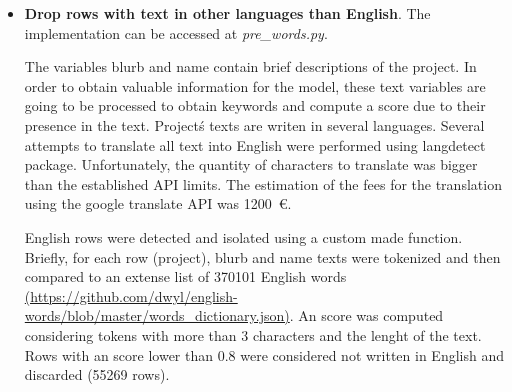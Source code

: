 \documentclass{article}
\begin{document}
{\begin{itemize}
\begin{itemize}
	The number of columns was reduced to 304.
	
        \item Country pruning.
        The implementation can be accessed at \emph{pre\_country\_pruning.py}.  
	
	Projects in the dataset come from 198 countries. In order to reduce the number of variables, I performed count plots and percentages of successful projects by country. Only countries with more than 55\% of successful projects and more than 50 projects were kept (United Kingdom, Hong Kong, Japan, Singapore, China, Poland, Israel, Taiwan, Czech Republic, Greece, Indonesia, Argentina, Kenya, Iceland, Ghana, Portugal, Slovenia, Finland).
	
	The number of columns was reduced to 125.
	
	\item  Currency pruning.
	The implementation can be accessed at \emph{pre\_currency\_pruning.py }.
	
	Currency encodes 14 different levels. Count plots and percentages of succesfull projects were computed for tha variable 'currency\_orig'. Currencies with more than 55\% of successful projects were retained (GBP, HKD, SGD, JPY) and compared to the retained countries. All currency levels were dropped because the selected currencies correspond to countries that were already selected and the information was redundant.
	
	The number of columns was reduced to 112.
        
    \end{itemize}
    \item \textbf{Drop rows with text in other languages than English}.
    The implementation can be accessed at \emph{pre\_words.py}.
    
    The variables blurb and name contain brief descriptions of the project. In order to obtain valuable information for the model, these text variables are going to be processed to obtain keywords and compute a score due to their presence in the text. Project\'s texts are writen in several languages. Several attempts to translate all text into English were performed using langdetect package. Unfortunately, the quantity of characters to translate was bigger than the established API limits. The estimation of the fees for the translation using the google translate API was 1200~\euro.
    
    English rows were detected and isolated using a custom made function. Briefly, for each row (project), blurb and name texts were tokenized and then compared to an extense list of 370101 English words \url{(https://github.com/dwyl/english-words/blob/master/words_dictionary.json)}. An score was computed considering tokens with more than 3 characters and the lenght of the text. Rows with an score lower than 0.8 were considered not written in English and discarded (55269 rows).
    

\end{itemize}}
\end{document}
